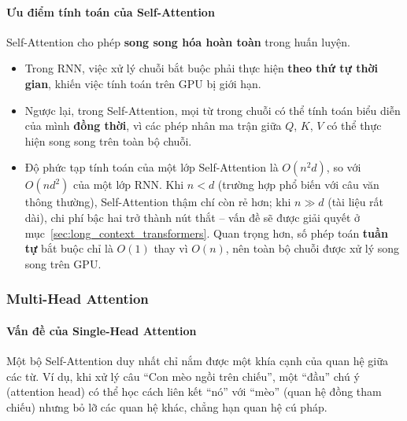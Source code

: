 \begin{center}
    \label{fig:scaled_dot_product_attention}
\end{center}
\paragraph{Ưu điểm tính toán của Self-Attention}
Self-Attention cho phép \textbf{song song hóa hoàn toàn} trong huấn luyện.
\begin{itemize}
	\item Trong RNN, việc xử lý chuỗi bắt buộc phải thực hiện \textbf{theo thứ tự thời gian}, khiến việc tính toán trên GPU bị giới hạn.
	\item Ngược lại, trong Self-Attention, mọi từ trong chuỗi có thể tính toán biểu diễn của mình \textbf{đồng thời}, vì các phép nhân ma trận giữa $Q$, $K$, $V$ có thể thực hiện song song trên toàn bộ chuỗi.
	\item Độ phức tạp tính toán của một lớp Self-Attention là $O(n^2 d)$, so với $O(n d^2)$ của một lớp RNN. Khi $n < d$ (trường hợp phổ biến với câu văn thông thường), Self-Attention thậm chí còn rẻ hơn; khi $n \gg d$ (tài liệu rất dài), chi phí bậc hai trở thành nút thắt -- vấn đề sẽ được giải quyết ở mục~\ref{sec:long_context_transformers}. Quan trọng hơn, số phép toán \textbf{tuần tự} bắt buộc chỉ là $O(1)$ thay vì $O(n)$, nên toàn bộ chuỗi được xử lý song song trên GPU.
\end{itemize}
\subsubsection{Multi-Head Attention}
\paragraph{Vấn đề của Single-Head Attention}
Một bộ Self-Attention duy nhất chỉ nắm được một khía cạnh của quan hệ giữa các từ. Ví dụ, khi xử lý câu “Con mèo ngồi trên chiếu”, một “đầu” chú ý (attention head) có thể học cách liên kết “nó” với “mèo” (quan hệ đồng tham chiếu) nhưng bỏ lỡ các quan hệ khác, chẳng hạn quan hệ cú pháp.

